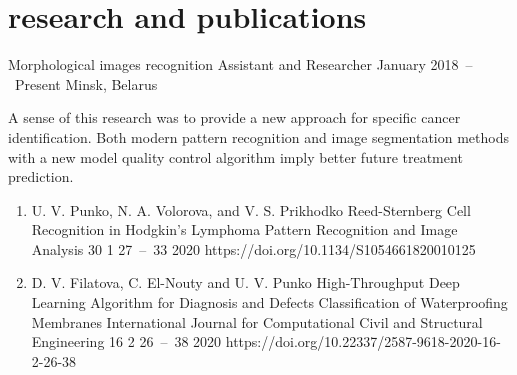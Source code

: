 \documentclass{punko-resume}
\begin{document}
\begin{minipage}[t]{0.65\textwidth}
\section{research and publications}
\experience
{Morphological images recognition}
{Assistant and Researcher}
{January 2018~--~Present}
{Minsk, Belarus}
\begin{textsection}
A sense of this research was to provide a new approach for specific cancer identification.
Both modern pattern recognition and image segmentation methods with a new model quality control algorithm imply better future treatment prediction.
\end{textsection}

\begin{enumerate}
\item
\publication
{U. V. Punko, N. A. Volorova, and V. S. Prikhodko}
{Reed-Sternberg Cell Recognition in Hodgkin's Lymphoma}
{Pattern Recognition and Image Analysis}
{30}
{1}
{27~--~33}
{2020}
{https://doi.org/10.1134/S1054661820010125}
\item
\publication
{D. V. Filatova, C. El-Nouty and U. V. Punko}
{High-Throughput Deep Learning Algorithm for Diagnosis and Defects Classification of Waterproofing Membranes}
{International Journal for Computational Civil and Structural Engineering}
{16}
{2}
{26~--~38}
{2020}
{https://doi.org/10.22337/2587-9618-2020-16-2-26-38}
\end{enumerate}

\end{minipage}
\hfill
\end{document}

